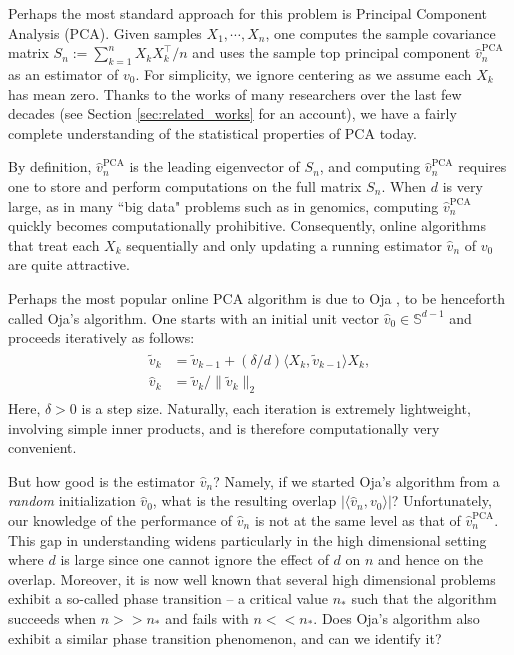 \documentclass[12pt]{article}
\newcommand{\PCA}{\text{PCA}}
\def\sS{{\mathbb{S}}}
\begin{document}
Perhaps the most standard approach for this problem is Principal Component Analysis (PCA). Given samples $X_1,\cdots, X_n$, one computes the sample covariance matrix $S_n:=\sum_{k=1}^n X_kX_k^\top/n$ and uses the sample top principal component $\hat v_n^\PCA$ as an estimator of $v_0$. For simplicity, we ignore centering as we assume each $X_k$ has mean zero. Thanks to the works of many researchers over the last few decades (see Section \ref{sec:related_works} for an account), we have a fairly complete understanding of the statistical properties of PCA today.

 \medskip
 
 By definition, $\hat v_n^\PCA$ is the leading eigenvector of $S_n$, and computing $\hat v_n^\PCA$ requires one to store and perform computations on the full matrix $S_n$. When $d$ is very large, as in many ``big data" problems such as in genomics, computing $\hat v_n^\PCA$ quickly becomes computationally prohibitive. Consequently, online algorithms that treat each $X_k$ sequentially and only updating a running estimator $\hat v_n$ of $v_0$ are quite attractive.

\medskip
 
 Perhaps the most popular online PCA algorithm is due to Oja \citep{oja1982simplified}, to be henceforth called Oja's algorithm. One starts with an initial unit vector $\hat v_0\in \sS^{d-1}$ and proceeds iteratively as follows:
\begin{align}\label{eqn:oja_main_recursion}
\begin{split}
    \tilde v_k &= \tilde v_{k-1} + (\delta/d)\langle X_k,\tilde v_{k-1}\rangle X_k,\\
    \hat v_k &= \tilde v_k/\|\tilde v_k\|_2    
\end{split}
\end{align}Here, $\delta>0$ is a step size. Naturally, each iteration is extremely lightweight, involving simple inner products, and is therefore computationally very convenient.

 \medskip

But how good is the estimator $\hat v_n$? Namely, if we started Oja's algorithm from a \textit{random} initialization $\hat v_0$, what is the resulting overlap $|\langle \hat v_n,v_0\rangle|$? Unfortunately, our knowledge of the performance of $\hat v_n$ is not at the same level as that of $\hat v_n^\PCA$. This gap in understanding widens particularly in the high dimensional setting where $d$ is large since one cannot ignore the effect of $d$ on $n$ and hence on the overlap. Moreover, it is now well known that several high dimensional problems \citep{baikbenarouspeche,donoho2009observed} exhibit a so-called phase transition -- a critical value $n_*$ such that the algorithm succeeds when $n>>n_*$ and fails with $n<<n_*$. Does Oja's algorithm also exhibit a similar phase transition phenomenon, and can we identify it?
\end{document}
